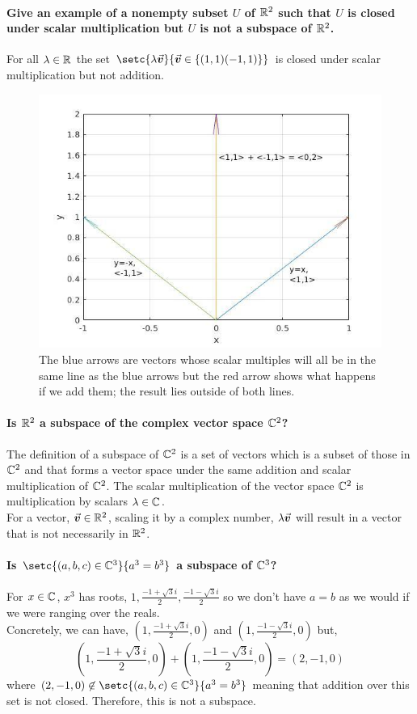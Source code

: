 \documentclass[MathsNotesBase.tex]{subfiles}
\begin{document}
	\paragraph{\small{Give an example of a nonempty subset $U$ of $\mathbb{R}^{2}$ such that $U$ is closed under scalar multiplication but $U$ is not a subspace of $\mathbb{R}^{2}$.}}	
	For all $\lambda \in \mathbb{R}^{}$ the set $\setc{\lambda\v}{\v \in \{(1,1) (-1,1)\} }$ is closed under scalar multiplication but not addition.
	\begin{figure}[h!]
	 \includegraphics[width=\linewidth]{resources/img/not_closed_under_addition.png}
	 \caption{The blue arrows are vectors whose scalar multiples will all be in the same line as the blue arrows but the red arrow shows what happens if we add them; the result lies outside of both lines.}
	\end{figure}
	
	
	\paragraph{Is $\mathbb{R}^{2}$ a subspace of the complex vector space $\mathbb{C}^{2}$?}	
	The definition of a subspace of $\mathbb{C}^{2}$ is a set of vectors which is a subset of those in $\mathbb{C}^{2}$ and that forms a vector space under the same addition and scalar multiplication of $\mathbb{C}^{2}$. The scalar multiplication of the vector space $\mathbb{C}^{2}$ is multiplication by scalars $\lambda \in \mathbb{C}^{}$.\\
	For a vector, $\vec{\bm{v}} \in \mathbb{R}^{2}$, scaling it by a complex number, $\lambda\vec{\bm{v}}$ will result in a vector that is not necessarily in $\mathbb{R}^{2}$.
	
	
	\paragraph{Is $\setc{(a,b,c) \in \C{3}}{a^3 = b^3}$ a subspace of $\mathbb{C}^{3}$?}
	For $x \in \mathbb{C}^{}$, $x^3$ has roots, $1, \frac{-1 + \sqrt{3}i}{2}, \frac{-1 - \sqrt{3}i}{2}$ so we don't have $a = b$ as we would if we were ranging over the reals. \\
	Concretely, we can have, $(1,\frac{-1 + \sqrt{3}i}{2},0)$ and $(1,\frac{-1 - \sqrt{3}i}{2},0)$ but,
	\[ (1,\frac{-1 + \sqrt{3}i}{2},0) + (1,\frac{-1 - \sqrt{3}i}{2},0) = (2,-1,0) \]
	where $(2,-1,0) \not\in \setc{(a,b,c) \in \C{3}}{a^3 = b^3}$ meaning that addition over this set is not closed. Therefore, this is not a subspace.
	
\end{document}
